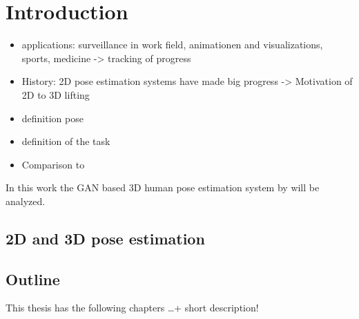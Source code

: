 \section{Introduction}


\begin{itemize}
	\item applications: surveillance in work field, animationen and visualizations, sports, medicine -> tracking of progress
	\item History: 2D pose estimation systems have made big progress -> Motivation of 2D to 3D lifting
	\item definition pose
	\item definition of the task
	\item Comparison to \citet{wandt19}
\end{itemize}

In this work the GAN based 3D human pose estimation system by \citet{drover18} will be analyzed.

\subsection{2D and 3D pose estimation}

\subsection{Outline}
This thesis has the following chapters \dots + short description!